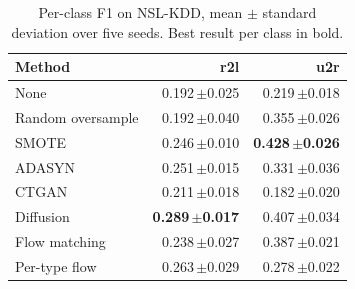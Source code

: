 \begin{table}[t]
\centering
\caption{Per-class F1 on NSL-KDD, mean $\pm$ standard deviation over five seeds. Best result per class in bold.}
\label{tab:full_nslkdd}
\begin{tabular}{lrr}
\toprule
Method & r2l & u2r \\
\midrule
None & 0.192\,\tiny{$\pm$0.025} & 0.219\,\tiny{$\pm$0.018} \\
Random oversample & 0.192\,\tiny{$\pm$0.040} & 0.355\,\tiny{$\pm$0.026} \\
SMOTE & 0.246\,\tiny{$\pm$0.010} & \textbf{0.428\,\tiny{$\pm$0.026}} \\
ADASYN & 0.251\,\tiny{$\pm$0.015} & 0.331\,\tiny{$\pm$0.036} \\
\midrule
CTGAN & 0.211\,\tiny{$\pm$0.018} & 0.182\,\tiny{$\pm$0.020} \\
Diffusion & \textbf{0.289\,\tiny{$\pm$0.017}} & 0.407\,\tiny{$\pm$0.034} \\
Flow matching & 0.238\,\tiny{$\pm$0.027} & 0.387\,\tiny{$\pm$0.021} \\
Per-type flow & 0.263\,\tiny{$\pm$0.029} & 0.278\,\tiny{$\pm$0.022} \\
\bottomrule
\end{tabular}
\end{table}
